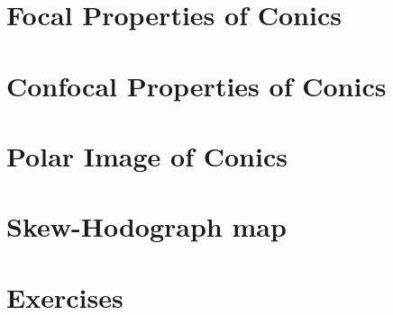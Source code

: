 \section{Focal Properties of Conics}
\label{sec:09-focal}


\section{Confocal Properties of Conics}
\label{sec:09-confocal}



\section{Polar Image of Conics}
\label{sec:09-polarimage }


\section{Skew-Hodograph map}
\label{sec:09-hodograph}


\section{Exercises}
\label{sec:09-exercises}



